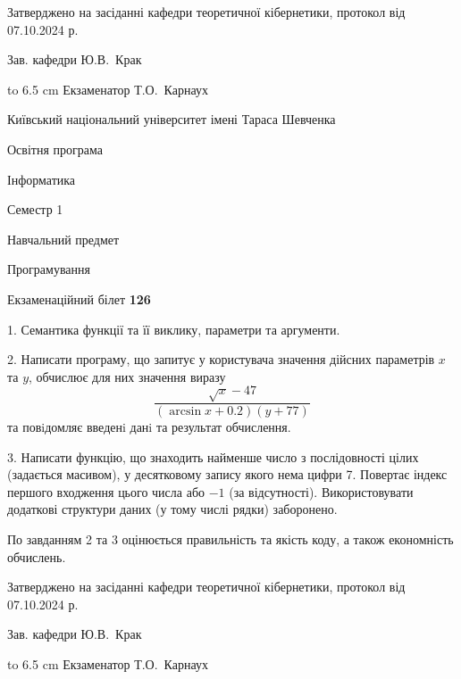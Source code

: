 \documentclass[12pt, ukrainian]{article}
\begin{document}
{\smallskip\smallskip \begin {scriptsize} Затверджено на засіданні кафедри теоретичної кібернетики, протокол   від   07.10.2024 р.\par\smallskip\smallskip\smallskip\smallskip
{\parbox {6.5 cm} {Зав. кафедри \dotfill Ю.В.~Крак}}\hspace {0.7cm} {\hbox to 6.5 cm { Екзаменатор \dotfill Т.О.~Карнаух}} \end{scriptsize}}
\vspace{0.9cm}
{{\begin {scriptsize}\par
{ \center  Київський національний університет імені Тараса Шевченка \par}
{\parbox {5 cm}{Освітня програма \hfill}{\parbox {7 cm}{Інформатика\hfill}}\parbox {6 cm}{\hfill Семестр 1}}\par
{\parbox {5 cm} {Навчальний предмет \hfill}\parbox {7 cm}{Програмування \hfill}\parbox {6cm}{\hfill}\par}\vspace{-15pt} \end{scriptsize}}{\center Екзаменаційний білет \No \textbf { 126 }\par}}
{%
1. Семантика функції та її виклику, параметри та аргументи.%
\par
2. Написати програму, що запитує у користувача значення дійсних параметрів $x$ та $y$, обчислює для них значення виразу 
$$\frac{\sqrt x - 47}{(\arcsin x + 0.2) (y + 77)}$$ 
та повiдомляє введенi данi та результат обчислення.

\par
3. Написати функцію, що знаходить найменше число з послідовності цілих (задається масивом), у десятковому запису якого нема цифри 7. Повертає індекс першого входження цього числа або $-1$ (за відсутності). Використовувати додаткові структури даних (у тому числі рядки) заборонено.

По завданням 2 та 3 оцінюється правильність та якість коду, а також економність обчислень.

}
{\smallskip\smallskip \begin {scriptsize} Затверджено на засіданні кафедри теоретичної кібернетики, протокол   від   07.10.2024 р.\par\smallskip\smallskip\smallskip\smallskip
{\parbox {6.5 cm} {Зав. кафедри \dotfill Ю.В.~Крак}}\hspace {0.7cm} {\hbox to 6.5 cm { Екзаменатор \dotfill Т.О.~Карнаух}} \end{scriptsize}}
\end{document}
